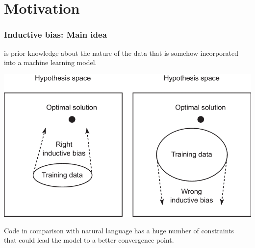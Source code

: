 \documentclass[notheorems,10pt]{beamer}
\begin{document}
\begin{frame}
  \titlepage
\end{frame}

\section[Motivation]{Motivation}

\begin{frame}
	\frametitle{Inductive bias: Main idea}

        \pause
	\begin{defi}
		 is prior knowledge about the nature of the data that is somehow incorporated into a machine learning model.
        \end{defi}
        \begin{center}
            \includegraphics[height=0.5\textheight]{attachments/ind_bias.png}
        \end{center}
        
        \pause
	Code in comparison with natural language has a huge number of constraints  \\
        that could lead the model to a better convergence point.
\end{frame}
\end{document}
